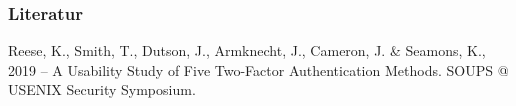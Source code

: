 \begin{frame}
\frametitle{Literatur}

\begin{thebibliography}{xxx}
    Reese, K., Smith, T., Dutson, J., Armknecht, J., Cameron, J. \& Seamons, K., 2019 \---
    A Usability Study of Five Two-Factor Authentication Methods. SOUPS @ USENIX Security Symposium.
\end{thebibliography}
\end{frame}
